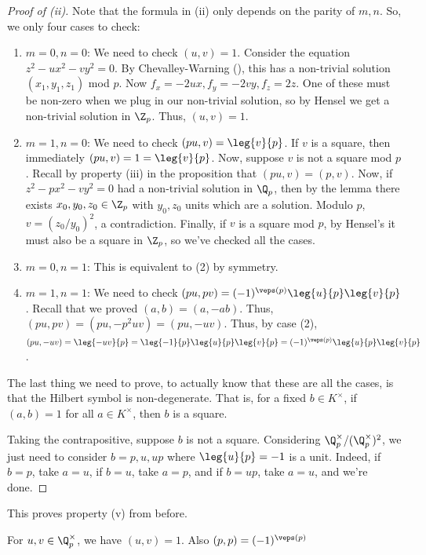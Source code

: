 \begin{proof}[Proof of (ii)]
    Note that the formula in (ii) only depends on the parity of $m,n$. So, we only four cases to check:
    \begin{enumerate}
        \item $m=0,n=0$: We need to check $(u,v)=1$. Consider the equation $z^2-ux^2-vy^2=0$. By Chevalley-Warning (), this has a non-trivial solution $(x_1,y_1,z_1)$ mod $p$. Now $f_x = -2ux,f_y=-2vy,f_z=2z$. One of these must be non-zero when we plug in our non-trivial solution, so by Hensel we get a non-trivial solution in $\Z_p$. Thus, $(u,v)=1$.
        \item $m=1,n=0$: We need to check $(pu,v)=\leg{v}{p}$. If $v$ is a square, then immediately $(pu,v)=1=\leg{v}{p}$. Now, suppose $v$ is not a square mod $p$. Recall by property (iii) in the proposition that $(pu,v)=(p,v)$. Now, if $z^2-px^2-vy^2=0$ had a non-trivial solution in $\Q_p$, then by the lemma there exists $x_0,y_0,z_0 \in \Z_p$ with $y_0,z_0$ units which are a solution. Modulo $p$, $v=(z_0/y_0)^2$, a contradiction. Finally, if $v$ is a square mod $p$, by Hensel's it must also be a square in $\Z_p$, so we've checked all the cases.
        \item $m=0,n=1$: This is equivalent to (2) by symmetry.
        \item $m=1,n=1$: We need to check $(pu,pv)=(-1)^{\veps(p)}\leg{u}{p}\leg{v}{p}$. Recall that we proved $(a,b)=(a,-ab)$. Thus, $(pu,pv)=(pu,-p^2uv)=(pu,-uv)$. Thus, by case (2), $(pu,-uv)=\leg{-uv}{p}=\leg{-1}{p}\leg{u}{p}\leg{v}{p}=(-1)^{\veps(p)}\leg{u}{p}\leg{v}{p}$.
    \end{enumerate}

    The last thing we need to prove, to actually know that these are all the cases, is that the Hilbert symbol is non-degenerate. That is, for a fixed $b \in K^\times$, if $(a,b)=1$ for all $a \in K^\times$, then $b$ is a square.

    Taking the contrapositive, suppose $b$ is not a square. Considering $\Q_p^\times/(\Q_p^\times)^2$, we just need to consider $b=p,u,up$ where $\leg{u}{p}=-1$ is a unit. Indeed, if $b=p$, take $a=u$, if $b=u$, take $a=p$, and if $b=up$, take $a=u$, and we're done.
\end{proof}

\begin{cor}
    This proves property (v) from before.
\end{cor}

\begin{cor}
    For $u,v\in \Q_p^\times$, we have $(u,v)=1$. Also $(p,p)=(-1)^{\veps (p)}$
\end{cor}

